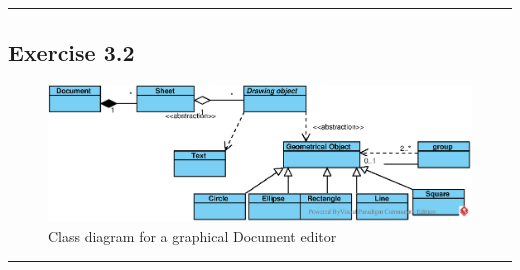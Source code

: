 \noindent\rule{\textwidth}{0.4pt} %


\subsection{Exercise 3.2}
\begin{figure}[H]
    \centering
    \includegraphics[width=\textwidth]{images/EPS/graphicalDocumentEditor.eps}
    \caption{Class diagram for a graphical Document editor}
    \label{fig:GraphicalDocumentEditor}
\end{figure}

\noindent\rule{\textwidth}{0.4pt} %


